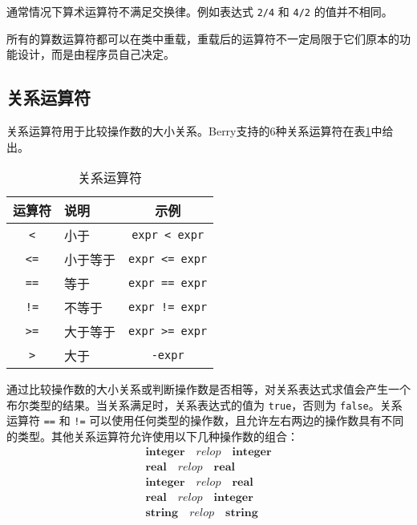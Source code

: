 通常情况下算术运算符不满足交换律。例如表达式 \texttt{2/4} 和 \texttt{4/2} 的值并不相同。

所有的算数运算符都可以在类中重载，重载后的运算符不一定局限于它们原本的功能设计，而是由程序员自己决定。

\subsection{关系运算符}

关系运算符用于比较操作数的大小关系。Berry支持的6种关系运算符在表\ref{tab::relop_operator}中给出。

\begin{table}[htb]
    \centering
    \setlength{\tabcolsep}{10mm}
    \begin{tabular}{clc} \toprule
        \textbf{运算符} & \textbf{说明} & \textbf{示例} \\ \midrule
        \texttt{<} & 小于 & \texttt{expr < expr} \\
        \texttt{<=} & 小于等于 & \texttt{expr <= expr} \\
        \texttt{==} & 等于 & \texttt{expr == expr} \\
        \texttt{!=} & 不等于 & \texttt{expr != expr} \\
        \texttt{>=} & 大于等于 & \texttt{expr >= expr} \\
        \texttt{>} & 大于 & \texttt{-expr} \\
        \bottomrule
    \end{tabular}
    \caption{关系运算符}
    \label{tab::relop_operator}
\end{table}

通过比较操作数的大小关系或判断操作数是否相等，对关系表达式求值会产生一个布尔类型的结果。当关系满足时，关系表达式的值为 \texttt{true}，否则为 \texttt{false}。关系运算符 \texttt{==} 和 \texttt{!=} 可以使用任何类型的操作数，且允许左右两边的操作数具有不同的类型。其他关系运算符允许使用以下几种操作数的组合：\vspace{-0.5em}
\begin{gather*}
    \bm{integer} \quad relop \quad \bm{integer} \\
    \bm{real} \quad relop \quad \bm{real} \\
    \bm{integer} \quad relop \quad \bm{real} \\
    \bm{real} \quad relop \quad \bm{integer} \\
    \bm{string} \quad relop \quad \bm{string}
\end{gather*}

